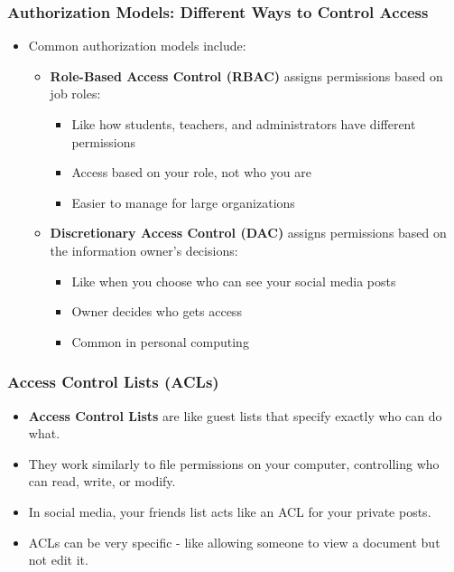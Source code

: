 \documentclass{beamer}
\begin{document}
\begin{frame}
    \frametitle{Authorization Models: Different Ways to Control Access}
    \begin{itemize}
        \item Common authorization models include:
            \begin{itemize}
                \item \textbf{Role-Based Access Control (RBAC)} assigns permissions based on job roles:
                    \begin{itemize}
                        \item Like how students, teachers, and administrators have different permissions
                        \item Access based on your role, not who you are
                        \item Easier to manage for large organizations
                    \end{itemize}
                \item \textbf{Discretionary Access Control (DAC)} assigns permissions based on the information owner's decisions:
                    \begin{itemize}
                        \item Like when you choose who can see your social media posts
                        \item Owner decides who gets access
                        \item Common in personal computing
                    \end{itemize}
            \end{itemize}
    \end{itemize}
\end{frame}

\begin{frame}
    \frametitle{Access Control Lists (ACLs)}
    \begin{itemize}
        \item \textbf{Access Control Lists} are like guest lists that specify exactly who can do what.
        \item They work similarly to file permissions on your computer, controlling who can read, write, or modify.
        \item In social media, your friends list acts like an ACL for your private posts.
        \item ACLs can be very specific - like allowing someone to view a document but not edit it.
    \end{itemize}
\end{frame}
\end{document}
